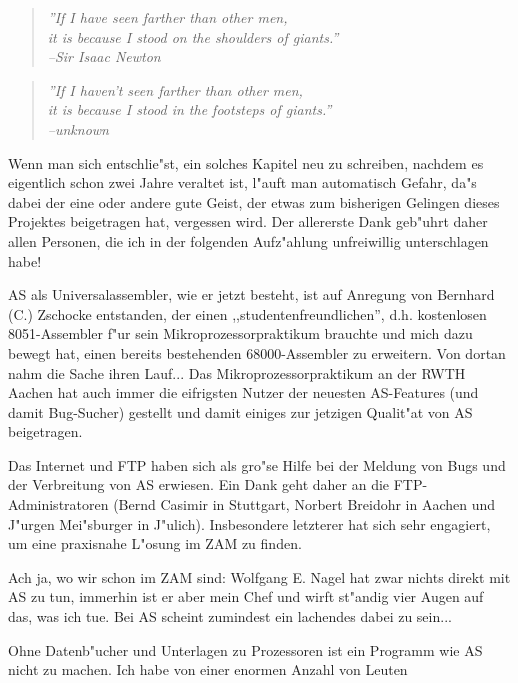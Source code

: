 \documentclass[12pt,a4paper,twoside]{report}
\begin{document}
{\begin{quote}{\it
''If I have seen farther than other men, \\
it is because I stood on the shoulders of giants.'' \\
\hspace{2cm} --Sir Isaac Newton}
\end{quote}
\begin{quote}{\it
''If I haven't seen farther than other men, \\
it is because I stood in the footsteps of giants.'' \\
\hspace{2cm} --unknown}
\end{quote}
\par
Wenn man sich entschlie"st, ein solches Kapitel neu zu schreiben, 
nachdem es eigentlich schon zwei Jahre veraltet ist, l"auft man 
automatisch Gefahr, da"s dabei der eine oder andere gute Geist, der 
etwas zum bisherigen Gelingen dieses Projektes beigetragen hat,
vergessen wird.  Der 
allererste  Dank geb"uhrt daher allen Personen, die ich in der 
folgenden Aufz"ahlung unfreiwillig unterschlagen habe!  
\par
AS als Universalassembler, wie er jetzt besteht, ist auf Anregung von
Bernhard (C.) Zschocke entstanden, der einen ,,studentenfreundlichen'', 
d.h. kostenlosen 8051-Assembler f"ur sein Mikroprozessorpraktikum 
brauchte und mich dazu bewegt hat, einen bereits bestehenden 
68000-Assembler zu erweitern.  Von dortan nahm die Sache ihren Lauf...
Das Mikroprozessorpraktikum an der RWTH Aachen hat auch immer die
eifrigsten Nutzer der neuesten AS-Features (und damit Bug-Sucher) 
gestellt und damit einiges zur jetzigen Qualit"at von AS beigetragen.
\par
Das Internet und FTP haben sich als gro"se Hilfe bei der Meldung von
Bugs und der Verbreitung von AS erwiesen.  Ein Dank geht daher an
die FTP-Administratoren (Bernd Casimir in Stuttgart, Norbert Breidohr
in Aachen und J"urgen Mei"sburger in J"ulich).  Insbesondere letzterer 
hat sich sehr engagiert, um eine praxisnahe L"osung im ZAM zu 
finden.
\par
Ach ja, wo wir schon im ZAM sind: Wolfgang E. Nagel hat zwar nichts
direkt mit AS zu tun, immerhin ist er aber mein Chef und wirft 
st"andig vier Augen auf das, was ich tue.  Bei AS scheint zumindest
ein lachendes dabei zu sein...
\par
Ohne Datenb"ucher und Unterlagen zu Prozessoren ist ein Programm wie
AS nicht zu machen.  Ich habe von einer enormen Anzahl von Leuten
}
\end{document}
